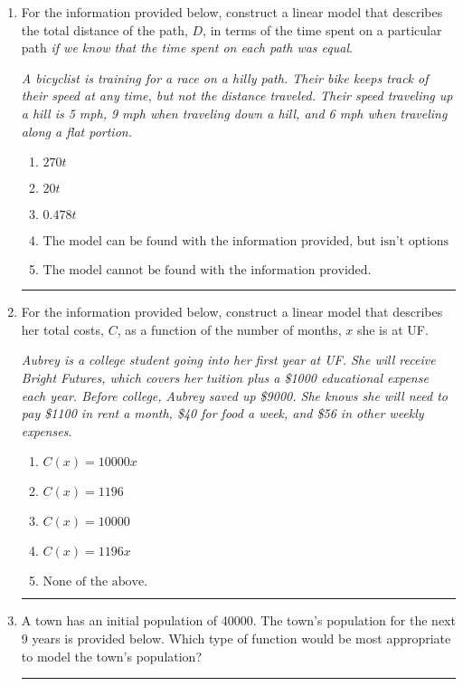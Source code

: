 \documentclass[14pt]{extbook}
\newcommand{\litem}[1]{\item#1\hspace*{-1cm}\rule{\textwidth}{0.4pt}}
\begin{document}
\begin{enumerate}
{\begin{enumerate}[label=\Alph*.]
\end{enumerate} }
\litem{
For the information provided below, construct a linear model that describes the total distance of the path, $D$, in terms of the time spent on a particular path \textit{if we know that the time spent on each path was equal}.
\begin{center}
    \textit{ A bicyclist is training for a race on a hilly path. Their bike keeps track of their speed at any time, but not the distance traveled. Their speed traveling up a hill is 5 mph, 9 mph when traveling down a hill, and 6 mph when traveling along a flat portion. }
\end{center}
\begin{enumerate}[label=\Alph*.]
\item \( 270 t \)
\item \( 20 t \)
\item \( 0.478 t \)
\item \( \text{The model can be found with the information provided, but isn't options 1-3.} \)
\item \( \text{The model cannot be found with the information provided.} \)

\end{enumerate} }
\litem{
For the information provided below, construct a linear model that describes her total costs, $C$, as a function of the number of months, $x$ she is at UF. 
\begin{center}
    \textit{ Aubrey is a college student going into her first year at UF. She will receive Bright Futures, which covers her tuition plus a \$1000 educational expense each year. Before college, Aubrey saved up \$9000. She knows she will need to pay \$1100 in rent a month, \$40 for food a week, and \$56 in other weekly expenses. }
\end{center}
\begin{enumerate}[label=\Alph*.]
\item \( C(x) = 10000 x \)
\item \( C(x) = 1196 \)
\item \( C(x) = 10000 \)
\item \( C(x) = 1196 x \)
\item \( \text{None of the above.} \)

\end{enumerate} }
\litem{
A town has an initial population of 40000. The town's population for the next 9 years is provided below. Which type of function would be most appropriate to model the town's population?

}
\end{enumerate}
\end{document}
